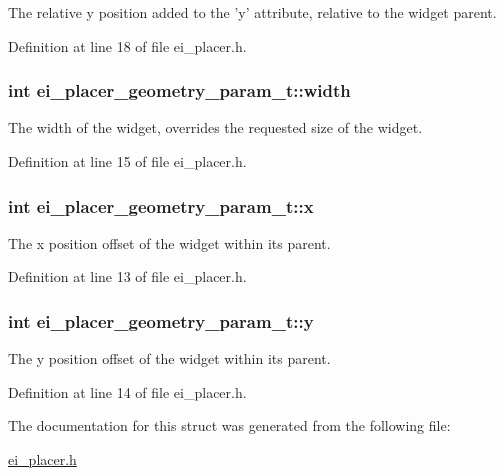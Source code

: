 The relative y position added to the 'y' attribute, relative to the widget parent. 



Definition at line 18 of file ei\+\_\+placer.\+h.

\hypertarget{structei__placer__geometry__param__t_a65101b00a7bb329e4607381014dcfcfb}{
\subsubsection[{width}]{\setlength{\rightskip}{0pt plus 5cm}int ei\+\_\+placer\+\_\+geometry\+\_\+param\+\_\+t\+::width}}\label{structei__placer__geometry__param__t_a65101b00a7bb329e4607381014dcfcfb}


The width of the widget, overrides the requested size of the widget. 



Definition at line 15 of file ei\+\_\+placer.\+h.

\hypertarget{structei__placer__geometry__param__t_a49274771b617cde0726439ed5df76a19}{
\subsubsection[{x}]{\setlength{\rightskip}{0pt plus 5cm}int ei\+\_\+placer\+\_\+geometry\+\_\+param\+\_\+t\+::x}}\label{structei__placer__geometry__param__t_a49274771b617cde0726439ed5df76a19}


The x position offset of the widget within its parent. 



Definition at line 13 of file ei\+\_\+placer.\+h.

\hypertarget{structei__placer__geometry__param__t_abe452e637888cc79b260cf5f6eab5f70}{
\subsubsection[{y}]{\setlength{\rightskip}{0pt plus 5cm}int ei\+\_\+placer\+\_\+geometry\+\_\+param\+\_\+t\+::y}}\label{structei__placer__geometry__param__t_abe452e637888cc79b260cf5f6eab5f70}


The y position offset of the widget within its parent. 



Definition at line 14 of file ei\+\_\+placer.\+h.



The documentation for this struct was generated from the following file\+:\begin{DoxyCompactItemize}
\item 
\hyperlink{ei__placer_8h}{ei\+\_\+placer.\+h}\end{DoxyCompactItemize}

